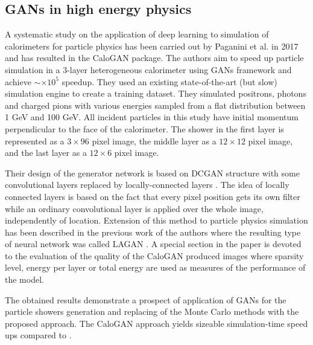 \subsection{GANs in high energy physics}
A  systematic study on the application of deep learning to simulation of calorimeters for particle physics has been carried out by Paganini et al. in 2017 \cite{paganini2017calogan} and has resulted in the CaloGAN package. The authors aim to speed up particle simulation in a 3-layer heterogeneous calorimeter  using GANs framework and achieve $\sim \times 10^5 $ speedup. They used an existing state-of-the-art (but slow) simulation engine \geant to create a training dataset. They simulated positrons, photons and charged pions with various energies sampled from a flat distribution between 1 GeV and 100 GeV. All incident particles in this study have initial momentum perpendicular to the face of the calorimeter. The shower in the first layer is represented as a $3 \times 96$ pixel image, the middle layer as a $12 \times 12$ pixel image, and the last layer as a $12 \times 6$ pixel image. 

Their design of the generator network is based on DCGAN structure \cite{radford2015unsupervised} with some convolutional layers replaced by locally-connected layers \cite{taigman2014deepface}. The idea of locally connected layers is based on the fact that every pixel position gets its own filter while an ordinary convolutional layer is applied over the whole image, independently of location. Extension of this method to particle physics simulation has been described in the previous work of the authors where the resulting type of neural network was called LAGAN \cite{de2017learning}. A special section in the paper is devoted to the evaluation of the quality of the CaloGAN produced images where  sparsity level,  energy per layer or total energy are used as measures of the performance of the model. 

The obtained results demonstrate a prospect of application of GANs for the particle showers generation and replacing of the Monte Carlo methods with the proposed approach. The CaloGAN approach yields sizeable simulation-time speed ups compared to \geant. 

